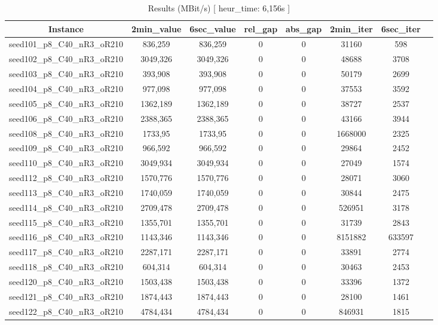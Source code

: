 \documentclass[a4paper]{article}
\begin{document}
\begin{center}
\begin{longtable}{cccccccc}
\caption{Results (MBit/s) [ heur\_time: 6,156s ] }
\tabularnewline
\hline
Instance & 2min\_value & 6sec\_value & rel\_gap & abs\_gap & 2min\_iter& 6sec\_iter\\
\hline
seed101\_p8\_C40\_nR3\_oR210 & 836,259 & 836,259 & 0 & 0 & 31160 & 598\\
\hline
seed102\_p8\_C40\_nR3\_oR210 & 3049,326 & 3049,326 & 0 & 0 & 48688 & 3708\\
\hline
seed103\_p8\_C40\_nR3\_oR210 & 393,908 & 393,908 & 0 & 0 & 50179 & 2699\\
\hline
seed104\_p8\_C40\_nR3\_oR210 & 977,098 & 977,098 & 0 & 0 & 37553 & 3592\\
\hline
seed105\_p8\_C40\_nR3\_oR210 & 1362,189 & 1362,189 & 0 & 0 & 38727 & 2537\\
\hline
seed106\_p8\_C40\_nR3\_oR210 & 2388,365 & 2388,365 & 0 & 0 & 43166 & 3944\\
\hline
seed108\_p8\_C40\_nR3\_oR210 & 1733,95 & 1733,95 & 0 & 0 & 1668000 & 2325\\
\hline
seed109\_p8\_C40\_nR3\_oR210 & 966,592 & 966,592 & 0 & 0 & 29864 & 2452\\
\hline
seed110\_p8\_C40\_nR3\_oR210 & 3049,934 & 3049,934 & 0 & 0 & 27049 & 1574\\
\hline
seed112\_p8\_C40\_nR3\_oR210 & 1570,776 & 1570,776 & 0 & 0 & 28071 & 3060\\
\hline
seed113\_p8\_C40\_nR3\_oR210 & 1740,059 & 1740,059 & 0 & 0 & 30844 & 2475\\
\hline
seed114\_p8\_C40\_nR3\_oR210 & 2709,478 & 2709,478 & 0 & 0 & 526951 & 3178\\
\hline
seed115\_p8\_C40\_nR3\_oR210 & 1355,701 & 1355,701 & 0 & 0 & 31739 & 2843\\
\hline
seed116\_p8\_C40\_nR3\_oR210 & 1143,346 & 1143,346 & 0 & 0 & 8151882 & 633597\\
\hline
seed117\_p8\_C40\_nR3\_oR210 & 2287,171 & 2287,171 & 0 & 0 & 33891 & 2774\\
\hline
seed118\_p8\_C40\_nR3\_oR210 & 604,314 & 604,314 & 0 & 0 & 30463 & 2453\\
\hline
seed120\_p8\_C40\_nR3\_oR210 & 1503,438 & 1503,438 & 0 & 0 & 33396 & 1372\\
\hline
seed121\_p8\_C40\_nR3\_oR210 & 1874,443 & 1874,443 & 0 & 0 & 28100 & 1461\\
\hline
seed122\_p8\_C40\_nR3\_oR210 & 4784,434 & 4784,434 & 0 & 0 & 846931 & 1815\\

\end{longtable}
\end{center}
\end{document}
